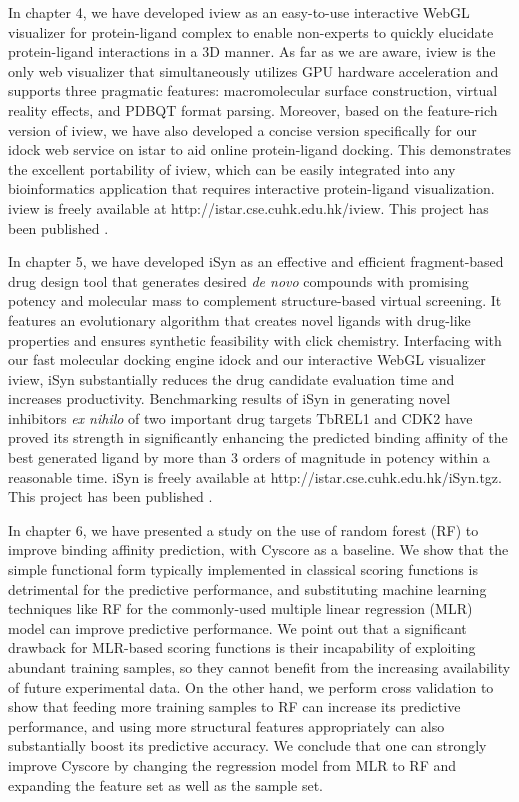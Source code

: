 In chapter 4, we have developed iview \citep{1366} as an easy-to-use interactive WebGL visualizer for protein-ligand complex to enable non-experts to quickly elucidate protein-ligand interactions in a 3D manner. As far as we are aware, iview is the only web visualizer that simultaneously utilizes GPU hardware acceleration and supports three pragmatic features: macromolecular surface construction, virtual reality effects, and PDBQT format parsing. Moreover, based on the feature-rich version of iview, we have also developed a concise version specifically for our idock web service on istar to aid online protein-ligand docking. This demonstrates the excellent portability of iview, which can be easily integrated into any bioinformatics application that requires interactive protein-ligand visualization. iview is freely available at http://istar.cse.cuhk.edu.hk/iview. This project has been published \citep{1366}.

In chapter 5, we have developed iSyn \citep{1409,1387} as an effective and efficient fragment-based drug design tool that generates desired \textit{de novo} compounds with promising potency and molecular mass to complement structure-based virtual screening. It features an evolutionary algorithm that creates novel ligands with drug-like properties and ensures synthetic feasibility with click chemistry. Interfacing with our fast molecular docking engine idock and our interactive WebGL visualizer iview, iSyn substantially reduces the drug candidate evaluation time and increases productivity. Benchmarking results of iSyn in generating novel inhibitors \textit{ex nihilo} of two important drug targets TbREL1 and CDK2 have proved its strength in significantly enhancing the predicted binding affinity of the best generated ligand by more than 3 orders of magnitude in potency within a reasonable time. iSyn is freely available at http://istar.cse.cuhk.edu.hk/iSyn.tgz. This project has been published \citep{1409,1387}.

In chapter 6, we have presented a study on the use of random forest (RF) to improve binding affinity prediction, with Cyscore \citep{1372} as a baseline. We show that the simple functional form typically implemented in classical scoring functions is detrimental for the predictive performance, and substituting machine learning techniques like RF for the commonly-used multiple linear regression (MLR) model can improve predictive performance. We point out that a significant drawback for MLR-based scoring functions is their incapability of exploiting abundant training samples, so they cannot benefit from the increasing availability of future experimental data. On the other hand, we perform cross validation to show that feeding more training samples to RF can increase its predictive performance, and using more structural features appropriately can also substantially boost its predictive accuracy. We conclude that one can strongly improve Cyscore by changing the regression model from MLR to RF and expanding the feature set as well as the sample set.

